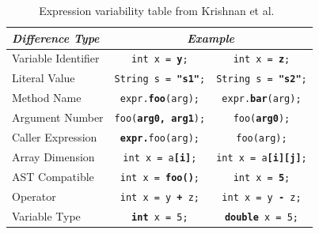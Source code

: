 \begin{table}[H]
\centering
\begin{tabular}{@{}lcc@{}}
\toprule
\textit{\textbf{Difference Type}} & \multicolumn{2}{c}{\textit{\textbf{Example}}}                                                \\ \midrule
Variable Identifier               & \multicolumn{1}{c|}{\texttt{int x = \textbf{y};}}       & \texttt{int x = \textbf{z};}       \\
Literal Value                     & \multicolumn{1}{c|}{\texttt{String s = \textbf{"s1"};}} & \texttt{String s = \textbf{"s2"};} \\
Method Name                       & \multicolumn{1}{c|}{\texttt{expr.\textbf{foo}(arg);}}   & \texttt{expr.\textbf{bar}(arg);}   \\
Argument Number                   & \multicolumn{1}{c|}{\texttt{foo(\textbf{arg0, arg1});}} & \texttt{foo(\textbf{arg0});}       \\
Caller Expression                 & \multicolumn{1}{c|}{\texttt{\textbf{expr.}foo(arg);}}   & \texttt{foo(arg);}                 \\
Array Dimension                   & \multicolumn{1}{c|}{\texttt{int x = a\textbf{[i]};}}    & \texttt{int x = a\textbf{[i][j]};} \\
AST Compatible                    & \multicolumn{1}{c|}{\texttt{int x = \textbf{foo()};}}   & \texttt{int x = \textbf{5};}       \\ \midrule
Operator                          & \multicolumn{1}{c|}{\texttt{int x = y \textbf{+} z;}}   & \texttt{int x = y \textbf{-} z;}   \\
Variable Type                     & \multicolumn{1}{c|}{\texttt{\textbf{int} x = 5;}}       & \texttt{\textbf{double} x = 5;}    \\ \bottomrule
\end{tabular}
\caption{Expression variability table from Krishnan et al.~\cite{krishnan2014unification}}
\label{tab:krishnanvariability}
\end{table}

